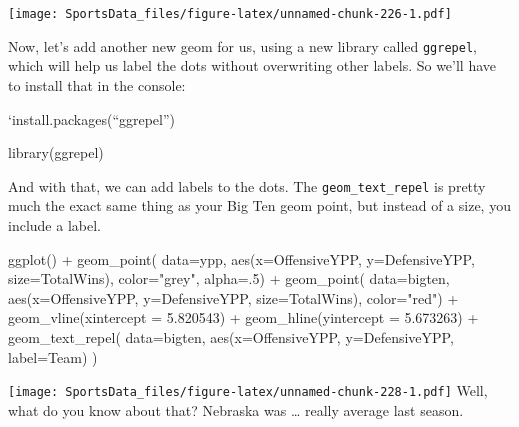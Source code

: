 \documentclass[
]{book}
\newenvironment{Shaded}{\begin{snugshade}}{\end{snugshade}}
\newcommand{\AttributeTok}[1]{\textcolor[rgb]{0.77,0.63,0.00}{#1}}
\newcommand{\DecValTok}[1]{\textcolor[rgb]{0.00,0.00,0.81}{#1}}
\newcommand{\FloatTok}[1]{\textcolor[rgb]{0.00,0.00,0.81}{#1}}
\newcommand{\FunctionTok}[1]{\textcolor[rgb]{0.00,0.00,0.00}{#1}}
\newcommand{\NormalTok}[1]{#1}
\newcommand{\SpecialCharTok}[1]{\textcolor[rgb]{0.00,0.00,0.00}{#1}}
\newcommand{\StringTok}[1]{\textcolor[rgb]{0.31,0.60,0.02}{#1}}
\begin{document}
\texttt{[image: SportsData\_files/figure-latex/unnamed-chunk-226-1.pdf]}

Now, let's add another new geom for us, using a new library called \texttt{ggrepel}, which will help us label the dots without overwriting other labels. So we'll have to install that in the console:

`install.packages(``ggrepel'')

\begin{Shaded}
\begin{Highlighting}[]
\FunctionTok{library}\NormalTok{(ggrepel)}
\end{Highlighting}
\end{Shaded}

And with that, we can add labels to the dots. The \texttt{geom\_text\_repel} is pretty much the exact same thing as your Big Ten geom point, but instead of a size, you include a label.

\begin{Shaded}
\begin{Highlighting}[]
\FunctionTok{ggplot}\NormalTok{() }\SpecialCharTok{+} 
  \FunctionTok{geom\_point}\NormalTok{(}
    \AttributeTok{data=}\NormalTok{ypp, }
    \FunctionTok{aes}\NormalTok{(}\AttributeTok{x=}\NormalTok{OffensiveYPP, }\AttributeTok{y=}\NormalTok{DefensiveYPP, }\AttributeTok{size=}\NormalTok{TotalWins), }
    \AttributeTok{color=}\StringTok{"grey"}\NormalTok{, }
    \AttributeTok{alpha=}\NormalTok{.}\DecValTok{5}\NormalTok{) }\SpecialCharTok{+} 
  \FunctionTok{geom\_point}\NormalTok{(}
    \AttributeTok{data=}\NormalTok{bigten, }
    \FunctionTok{aes}\NormalTok{(}\AttributeTok{x=}\NormalTok{OffensiveYPP, }\AttributeTok{y=}\NormalTok{DefensiveYPP, }\AttributeTok{size=}\NormalTok{TotalWins), }
    \AttributeTok{color=}\StringTok{"red"}\NormalTok{) }\SpecialCharTok{+} 
  \FunctionTok{geom\_vline}\NormalTok{(}\AttributeTok{xintercept =} \FloatTok{5.820543}\NormalTok{) }\SpecialCharTok{+} 
  \FunctionTok{geom\_hline}\NormalTok{(}\AttributeTok{yintercept =} \FloatTok{5.673263}\NormalTok{) }\SpecialCharTok{+} 
  \FunctionTok{geom\_text\_repel}\NormalTok{(}
    \AttributeTok{data=}\NormalTok{bigten, }
    \FunctionTok{aes}\NormalTok{(}\AttributeTok{x=}\NormalTok{OffensiveYPP, }\AttributeTok{y=}\NormalTok{DefensiveYPP, }\AttributeTok{label=}\NormalTok{Team)}
\NormalTok{  )}
\end{Highlighting}
\end{Shaded}

\texttt{[image: SportsData\_files/figure-latex/unnamed-chunk-228-1.pdf]}
Well, what do you know about that? Nebraska was \ldots{} really average last season.
\end{document}

